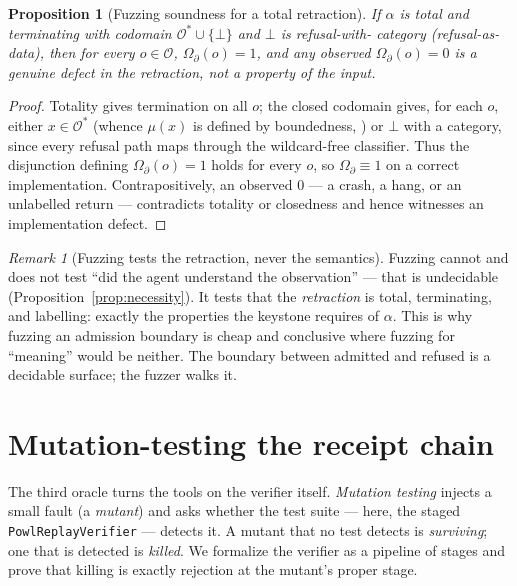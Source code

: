 \documentclass[11pt,oneside]{book}
\theoremstyle{definition}
\theoremstyle{plain}
\newtheorem{proposition}[theorem]{Proposition}
\theoremstyle{remark}
\newtheorem*{remark}{Remark}
\newcommand{\Obs}{\mathcal{O}}                 %
\newcommand{\Adm}{\mathcal{O}^{*}}             %
\newcommand{\muop}{\mu}                        %
\newcommand{\adm}{\alpha}                      %
\newcommand{\Rfsl}{\bot}                        %
\newcommand{\code}[1]{\texttt{#1}}
\begin{document}
\begin{proposition}[Fuzzing soundness for a total retraction]\label{prop:fuzz}
If $\adm$ is total and terminating with codomain $\Adm\cup\{\Rfsl\}$ and $\Rfsl$ is refusal-with-
category (refusal-as-data), then for every $o\in\Obs$, $\Omega_\partial(o)=1$, and any observed
$\Omega_\partial(o)=0$ is a genuine defect in the retraction, not a property of the input.
\end{proposition}

\begin{proof}
Totality gives termination on all $o$; the closed codomain gives, for each $o$, either $x\in\Adm$
(whence $\muop(x)$ is defined by boundedness, \cite[Def.~3.1]{keystone}) or $\Rfsl$ with a
category, since every refusal path maps through the wildcard-free classifier. Thus the disjunction
defining $\Omega_\partial(o)=1$ holds for every $o$, so $\Omega_\partial\equiv 1$ on a correct
implementation. Contrapositively, an observed $0$ --- a crash, a hang, or an unlabelled return ---
contradicts totality or closedness and hence witnesses an implementation defect.
\end{proof}

\begin{remark}[Fuzzing tests the retraction, never the semantics]
Fuzzing cannot and does not test ``did the agent understand the observation'' --- that is
undecidable (Proposition~\ref{prop:necessity}). It tests that the \emph{retraction} is total,
terminating, and labelling: exactly the properties the keystone requires of $\adm$. This is why
fuzzing an admission boundary is cheap and conclusive where fuzzing for ``meaning'' would be
neither. The boundary between admitted and refused is a decidable surface; the fuzzer walks it.
\end{remark}

\section{Mutation-testing the receipt chain}

The third oracle turns the tools on the verifier itself. \emph{Mutation testing} \cite{demillo1978,jia2011}
injects a small fault (a \emph{mutant}) and asks whether the test suite --- here, the staged
\code{PowlReplayVerifier} --- detects it. A mutant that no test detects is \emph{surviving}; one
that is detected is \emph{killed}. We formalize the verifier as a pipeline of stages and prove
that killing is exactly rejection at the mutant's proper stage.
\end{document}

